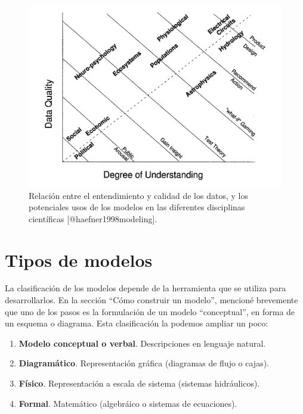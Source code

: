 \documentclass[
]{book}
\providecommand{\tightlist}{%
  \setlength{\itemsep}{0pt}\setlength{\parskip}{0pt}}
\begin{document}
\begin{figure}

{\centering \includegraphics[width=17.99in]{Unidad-I/uso-modelos} 

}

\caption{Relación entre el entendimiento y calidad de los datos, y los potenciales usos de los modelos en las diferentes disciplinas científicas [@haefner1998modeling].}\label{fig:unnamed-chunk-15}
\end{figure}

\hypertarget{tipos-de-modelos}{%
\section{Tipos de modelos}\label{tipos-de-modelos}}

La clasificación de los modelos depende de la herramienta que se utiliza para desarrollarlos. En la sección ``Cómo construir un modelo'', mencioné brevemente que uno de los pasos es la formulación de un modelo ``conceptual'', en forma de un esquema o diagrama. Esta clasificación la podemos ampliar un poco:

\begin{enumerate}
\def\labelenumi{\arabic{enumi}.}
\tightlist
\item
  \textbf{Modelo conceptual o verbal}. Descripciones en lenguaje natural.
\item
  \textbf{Diagramático}. Representación gráfica (diagramas de flujo o cajas).
\item
  \textbf{Físico}. Representación a escala de sistema (sistemas hidráulicos).
\item
  \textbf{Formal}. Matemático (algebráico o sistemas de ecuaciones).
\end{enumerate}
\end{document}

